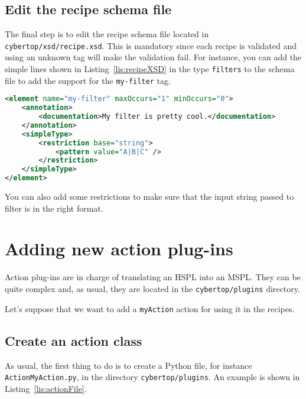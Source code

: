 \documentclass{scrartcl}
\begin{document}
\subsection{Edit the recipe schema file}

The final step is to edit the recipe schema file located in \lstinline|cybertop/xsd/recipe.xsd|. This is mandatory since each recipe is validated and using an unknown tag will make the validation fail. For instance, you can add the simple lines shown in Listing~\ref{lis:recipeXSD} in the type \lstinline|filters| to the schema file to add the support for the \lstinline|my-filter| tag.

\begin{lstlisting}[language = XML, caption = Snippet for the recipe schema file., label = lis:recipeXSD]
<element name="my-filter" maxOccurs="1" minOccurs="0">
	<annotation>
		<documentation>My filter is pretty cool.</documentation>
	</annotation>
	<simpleType>
		<restriction base="string">
			<pattern value="A|B|C" />
		</restriction>
	</simpleType>
</element>
\end{lstlisting}

You can also add some restrictions to make sure that the input string passed to filter is in the right format.

\section{Adding new action plug-ins}
\label{sec:addingNewActionPlugins}

Action plug-ins are in charge of translating an HSPL into an MSPL. They can be quite complex and, as usual, they are located in the \lstinline|cybertop/plugins| directory.

Let's suppose that we want to add a \lstinline|myAction| action for using it in the recipes.

\subsection{Create an action class}

As usual, the first thing to do is to create a Python file, for instance \lstinline|ActionMyAction.py|, in the directory \lstinline|cybertop/plugins|. An example is shown in Listing~\ref{lis:actionFile}.
\end{document}
